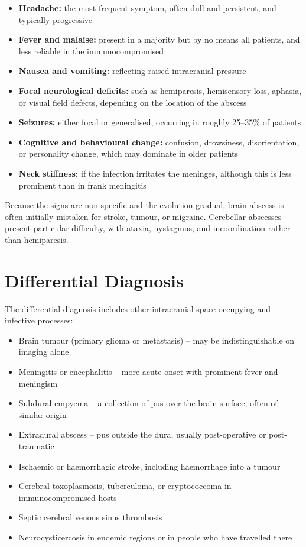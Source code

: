 \begin{itemize}
    \item \textbf{Headache:} the most frequent symptom, often dull and persistent, and typically progressive
    \item \textbf{Fever and malaise:} present in a majority but by no means all patients, and less reliable in the immunocompromised
    \item \textbf{Nausea and vomiting:} reflecting raised intracranial pressure
    \item \textbf{Focal neurological deficits:} such as hemiparesis, hemisensory loss, aphasia, or visual field defects, depending on the location of the abscess
    \item \textbf{Seizures:} either focal or generalised, occurring in roughly 25--35\% of patients
    \item \textbf{Cognitive and behavioural change:} confusion, drowsiness, disorientation, or personality change, which may dominate in older patients
    \item \textbf{Neck stiffness:} if the infection irritates the meninges, although this is less prominent than in frank meningitis
\end{itemize}

Because the signs are non-specific and the evolution gradual, brain abscess is often initially mistaken for stroke, tumour, or migraine. Cerebellar abscesses present particular difficulty, with ataxia, nystagmus, and incoordination rather than hemiparesis.

\section*{Differential Diagnosis}
The differential diagnosis includes other intracranial space-occupying and infective processes:

\begin{itemize}
    \item Brain tumour (primary glioma or metastasis) -- may be indistinguishable on imaging alone
    \item Meningitis or encephalitis -- more acute onset with prominent fever and meningism
    \item Subdural empyema -- a collection of pus over the brain surface, often of similar origin
    \item Extradural abscess -- pus outside the dura, usually post-operative or post-traumatic
    \item Ischaemic or haemorrhagic stroke, including haemorrhage into a tumour
    \item Cerebral toxoplasmosis, tuberculoma, or cryptococcoma in immunocompromised hosts
    \item Septic cerebral venous sinus thrombosis
    \item Neurocysticercosis in endemic regions or in people who have travelled there
\end{itemize}

